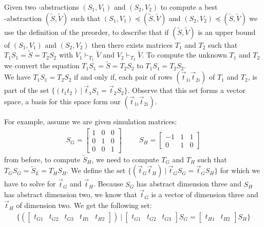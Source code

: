 Given two \qvasr-abstractions $(S_1, V_1)$ and $(S_2, V_2)$ to compute a best \\ \qvasr-abstraction $(\tilde{S}, \tilde{V})$ such that $(S_1, V_1) \preceq (\tilde{S}, \tilde{V})$ and $(S_2, V_2) \preceq (\tilde{S}, \tilde{V})$ we use the definition of the preorder, to describe that if $(\tilde{S}, \tilde{V})$ is an upper bound of $(S_1, V_1)$ and $(S_2, V_2)$ then there exists matrices $T_1$ and $T_2$ such that $T_1S_1 = \tilde{S} = T_2S_2$ with $V_1 \vdash_{T_1} \tilde{V}$ and $V_2 \vdash_{T_2} \tilde{V}$. To compute the unknown $T_1$ and $T_2$ we convert the equation $T_1S_1 = \tilde{S} = T_2S_2$ to $T_1S_1 = T_2S_2$. \\
We have $T_1S_1 = T_2S_2$ if and only if, each pair of rows $(\vec{t}_{1i}\vec{t}_{2i})$ of $T_1$ and $T_2$, is part of the set $\{ (t_1t_2)\ |\  \vec{t}_1S_1 = \vec{t}_2S_2\}$. Observe that this set forms a vector space, a basis for this space form our $(\vec{t}_{1i}\vec{t}_{2i})$. \\ \par
For example, assume we are given simulation matrices: 
\begin{align*}
	S_G = \begin{bmatrix} 1 & 0 & 0 \\ 0 & 1 & 0 \\0 & 0 & 1 \end{bmatrix} \hspace{1cm}
	S_H = \begin{bmatrix} -1 & 1 & 1 \\ 0 & 1 & 0 \end{bmatrix}
\end{align*}
 from before, to compute $\tilde{S}_H$, we need to compute $T_G$ and $T_H$ such that $T_GS_G = \tilde{S}_L = T_HS_H$. We define the set $\{ (\vec{t}_G\vec{t}_H)\ |\  \vec{t}_GS_G = \vec{t}_GS_H\}$ for which we have to solve for $\vec{t}_G$ and $\vec{t}_H$. Because $S_G$ has abstract dimension three and $S_H$ has abstract dimension two, we know that $\vec{t}_G$ is a vector of dimension three and $\vec{t}_H$ of dimension two. We get the following set:
\begin{align*}
	\{ (\begin{bmatrix} t_{G1} & t_{G2} & t_{G3} & t_{H1} & t_{H2} \end{bmatrix})\ |\  \begin{bmatrix} t_{G1} & t_{G2} & t_{G3}\end{bmatrix}S_G = \begin{bmatrix} t_{H1} & t_{H2} \end{bmatrix}S_H\}
\end{align*}
